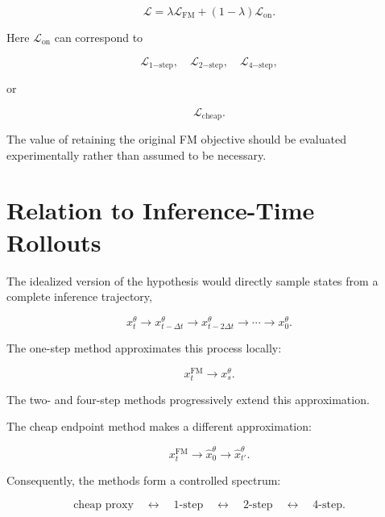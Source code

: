 \documentclass[11pt]{article}
\begin{document}
\begin{equation}
\boxed{
\mathcal{L}
=
\lambda\mathcal{L}_{\mathrm{FM}}
+
(1-\lambda)\mathcal{L}_{\mathrm{on}}.
}
\end{equation}

Here $\mathcal{L}_{\mathrm{on}}$ can correspond to

\begin{equation}
\mathcal{L}_{1\mathrm{-step}},
\quad
\mathcal{L}_{2\mathrm{-step}},
\quad
\mathcal{L}_{4\mathrm{-step}},
\end{equation}

or

\begin{equation}
\mathcal{L}_{\mathrm{cheap}}.
\end{equation}

The value of retaining the original FM objective should be evaluated
experimentally rather than assumed to be necessary.

\section{Relation to Inference-Time Rollouts}

The idealized version of the hypothesis would directly sample states from a
complete inference trajectory,

\begin{equation}
x_t^\theta
\rightarrow
x_{t-\Delta t}^\theta
\rightarrow
x_{t-2\Delta t}^\theta
\rightarrow
\cdots
\rightarrow
x_0^\theta.
\end{equation}

The one-step method approximates this process locally:

\begin{equation}
x_t^{\mathrm{FM}}
\rightarrow
x_s^\theta.
\end{equation}

The two- and four-step methods progressively extend this approximation.

The cheap endpoint method makes a different approximation:

\begin{equation}
x_t^{\mathrm{FM}}
\rightarrow
\hat{x}_0^\theta
\rightarrow
\hat{x}_{t'}^\theta.
\end{equation}

Consequently, the methods form a controlled spectrum:

\begin{equation}
\boxed{
\text{cheap proxy}
\quad
\longleftrightarrow
\quad
\text{1-step}
\quad
\longleftrightarrow
\quad
\text{2-step}
\quad
\longleftrightarrow
\quad
\text{4-step}.
}
\end{equation}
\end{document}
